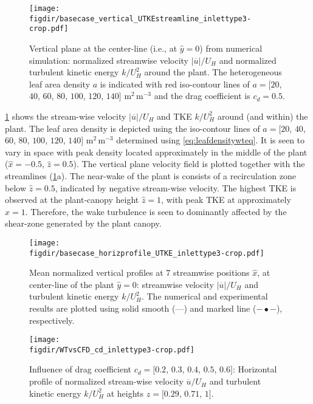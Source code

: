 \begin{figure}[h]
	\centering
	\texttt{[image: \\figdir/basecase\_vertical\_UTKEstreamline\_inlettype3-crop.pdf]}
	\caption{Vertical plane at the center-line (i.e., at $\hat{y}=0$) from numerical simulation:  normalized  streamwise velocity $|\overline{u}|/U_H$ and  normalized  turbulent kinetic energy $k/U_H^2$ around the plant. The heterogeneous leaf area density $a$ is indicated with red iso-contour lines of $a = [20$, $40$, $60$, $80$, $100$, $120$, $140]$ m$^2$\,m$^{-3}$ and the drag coefficient is $c_d=0.5$.}
	\label{fig:basecase_vertical_UTKEstreamline}
\end{figure}

\cref{fig:basecase_vertical_UTKEstreamline} shows the stream-wise velocity $|\overline{u}|/U_H$ and TKE $k/U_H^2$ around (and within) the plant. The leaf area density is depicted using the iso-contour lines of $a = [20$, $40$, $60$, $80$, $100$, $120$, $140]$ m$^2$\,m$^{-3}$ determined using \cref{eq:leafdensitywteq}. It is seen to vary in space with peak density located approximately in the middle of the plant ($\hat{x}=-0.5$, $\hat{z}=0.5$). The vertical plane velocity field is plotted together with the streamlines (\cref{fig:basecase_vertical_UTKEstreamline}a). The near-wake of the plant is consists of a recirculation zone below $\hat{z} = 0.5$, indicated by negative stream-wise velocity. The highest TKE is observed at the plant-canopy height $\hat{z} = 1$, with peak TKE at approximately $\hat{x} = 1$. Therefore, the wake turbulence is seen to dominantly affected by the shear-zone generated by the plant canopy.

\begin{figure}[h]
	\centering
	\texttt{[image: \\figdir/basecase\_horizprofile\_UTKE\_inlettype3-crop.pdf]}
	\caption{Mean normalized vertical profiles at 7 streamwise positions $\hat{x}$, at center-line of the plant $\hat{y} = 0$:  streamwise velocity $|\overline{u}|/U_H$ and  turbulent kinetic energy $k/U_H^2$. The numerical and experimental results are plotted using solid smooth (---) and marked line ($-\bullet-$), respectively. }
	\label{fig:basecase_horizprofile_UTKE}
\end{figure}

\begin{figure}[p]
	\centering
	\texttt{[image: \\figdir/WTvsCFD\_cd\_inlettype3-crop.pdf]}
	\caption{Influence of drag coefficient $c_d = [0.2$, $0.3$, $0.4$, $0.5$, $0.6]$: Horizontal profile of normalized stream-wise velocity $\overline{u}/U_H$ and turbulent kinetic energy $k/U_H^2$ at heights $\hat{z} = [0.29$, $0.71$, $1]$.}
	\label{fig:WTvsCFD_cd}
\end{figure}

